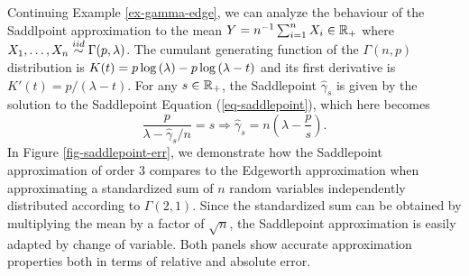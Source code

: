 \begin{example} \label{ex-gamma-saddle}
    Continuing Example \ref{ex-gamma-edge}, we can analyze the behaviour of the Saddlpoint approximation to the mean $Y = n^{-1}\sum_{i=1}^n X_i \in \mathbb{R}_+$ where $X_1, \ldots, X_n \stackrel{iid}{\sim} \Gamma(p, \lambda)$. The cumulant generating function of the $\Gamma(n, p)$ distribution is $K(t) = p\log\left(\lambda\right) - p\log\left(\lambda - t\right)$ and its first derivative is $K'(t) = p / (\lambda - t)$. For any $s \in \mathbb{R}_+$, the Saddlepoint $\hat\gamma_s$ is given by the solution to the Saddlepoint Equation (\ref{eq-saddlepoint}), which here becomes
    \begin{equation*}
        \frac{p}{\lambda - \hat\gamma_s/n} = s \Rightarrow \hat\gamma_s = n\left(\lambda - \frac{p}{s}\right).
    \end{equation*}
    In Figure \ref{fig-saddlepoint-err}, we demonstrate how the Saddlepoint approximation of order 3 compares to the Edgeworth approximation when approximating a standardized sum of $n$ random variables independently distributed according to $\Gamma(2, 1)$. Since the standardized sum can be obtained by multiplying the mean by a factor of $\sqrt{n}$, the Saddlepoint approximation is easily adapted by change of variable. Both panels show accurate approximation properties both in terms of relative and absolute error.
    

\end{example}
